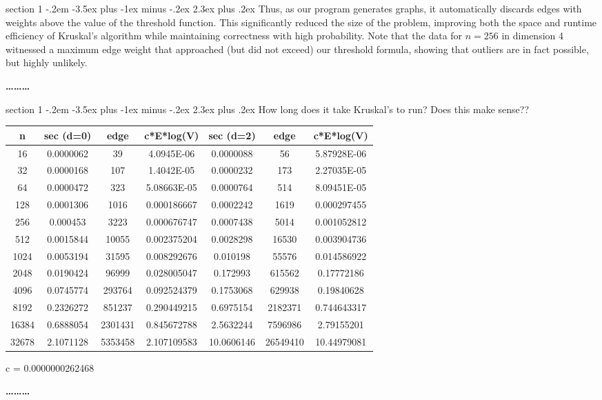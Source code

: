 \documentclass[12pt]{article}
\makeatletter
\newenvironment{problem}{\@startsection
       {section}
       {1}
       {-.2em}
       {-3.5ex plus -1ex minus -.2ex}
       {2.3ex plus .2ex}
       {\pagebreak[3]%
       \large\bf\noindent{Problem }
       }
       }
       {%
       \begin{center}\large\bf \ldots\ldots\ldots\end{center}}
\makeatother
\begin{document}
\begin{problem}{}
\noindent Thus, as our program generates graphs, it automatically
discards edges with weights above the value of the threshold function.
This significantly reduced the size of the problem, improving both the
space and runtime efficiency of Kruskal's algorithm while maintaining
correctness with high probability. Note that the data for $n=256$ in
dimension 4 witnessed a maximum edge weight that approached (but did
not exceed) our threshold formula, showing that outliers are in fact possible, but
highly unlikely.

\end{problem}

\begin{problem}{}
How long does it take Kruskal's to run? Does this make sense??\\

\begin{tabular}{ | c|c|c|c | c | c |c|}
  \hline                        
  n & sec (d=0) & edge & c*E*log(V) & sec (d=2) & edge & c*E*log(V) \\
  \hline
16&0.0000062&39&4.0945E-06&0.0000088&56&5.87928E-06\\
32&0.0000168&107&1.4042E-05&0.0000232&173&2.27035E-05\\
64&0.0000472&323&5.08663E-05&0.0000764&514&8.09451E-05\\
128&0.0001306&1016&0.000186667&0.0002242&1619&0.000297455\\
256&0.000453&3223&0.000676747&0.0007438&5014&0.001052812\\
512&0.0015844&10055&0.002375204&0.0028298&16530&0.003904736\\
1024&0.0053194&31595&0.008292676&0.010198&55576&0.014586922\\
2048&0.0190424&96999&0.028005047&0.172993&615562&0.17772186\\
4096&0.0745774&293764&0.092524379&0.1753068&629938&0.19840628\\
8192&0.2326272&851237&0.290449215&0.6975154&2182371&0.744643317\\
16384&0.6888054&2301431&0.845672788&2.5632244&7596986&2.79155201\\
32678&2.1071128&5353458&2.107109583&10.0606146&26549410&10.44979081\\
\hline  
\end{tabular}

c = 0.0000000262468
\vspace{8mm}


\end{problem}
\end{document}
